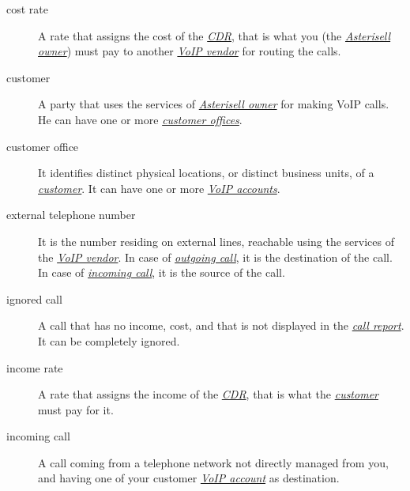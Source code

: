 \documentclass[letterpaper,10pt,english]{sphinxmanual}
\begin{document}
\begin{description}
\item[{cost rate}] \leavevmode{}\label{index:term-cost-rate}
A rate that assigns the cost of the {\hyperref[index:term-cdr]{\emph{CDR}}}, that is what you (the {\hyperref[index:term-asterisell-owner]{\emph{Asterisell owner}}}) must pay to another {\hyperref[index:term-voip-vendor]{\emph{VoIP vendor}}} for routing the calls.


\item[{customer}] \leavevmode{}\label{index:term-customer}
A party that uses the services of {\hyperref[index:term-asterisell-owner]{\emph{Asterisell owner}}} for making VoIP calls. He can have one or more {\hyperref[index:term-customer-office]{\emph{customer offices}}}.


\item[{customer office}] \leavevmode{}\label{index:term-customer-office}
It identifies distinct physical locations, or distinct business units, of a {\hyperref[index:term-customer]{\emph{customer}}}. It can have one or more {\hyperref[index:term-voip-account]{\emph{VoIP accounts}}}.


\item[{external telephone number}] \leavevmode{}\label{index:term-external-telephone-number}
It is the number residing on external lines, reachable using the services of the {\hyperref[index:term-voip-vendor]{\emph{VoIP vendor}}}. In case of {\hyperref[index:term-outgoing-call]{\emph{outgoing call}}}, it is the destination of the call. In case of {\hyperref[index:term-incoming-call]{\emph{incoming call}}}, it is the source of the call.


\item[{ignored call}] \leavevmode{}\label{index:term-ignored-call}
A call that has no income, cost, and that is not displayed in the {\hyperref[index:term-call-report]{\emph{call report}}}. It can be completely ignored.


\item[{income rate}] \leavevmode{}\label{index:term-income-rate}
A rate that assigns the income of the {\hyperref[index:term-cdr]{\emph{CDR}}}, that is what the {\hyperref[index:term-customer]{\emph{customer}}} must pay for it.


\item[{incoming call}] \leavevmode{}\label{index:term-incoming-call}
A call coming from a telephone network not directly managed from you, and having one of your customer {\hyperref[index:term-voip-account]{\emph{VoIP account}}} as destination.



\end{description}
\end{document}
